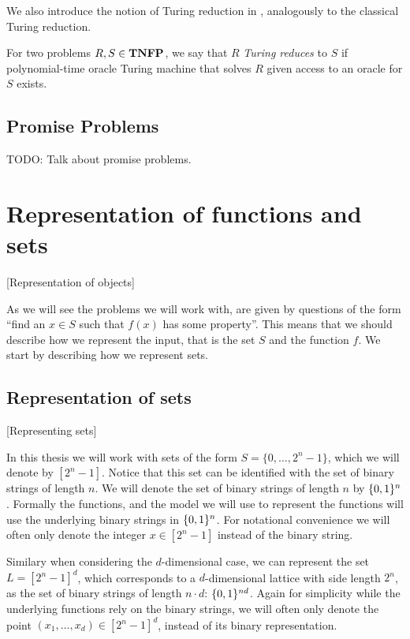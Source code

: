 We also introduce the notion of Turing reduction in \TFNP, analogously to the classical Turing reduction.

\begin{definition}
    For two problems $R, S \in \textbf{TNFP}$, we say that $R$ \emph{Turing reduces} to $S$ if polynomial-time oracle Turing machine that solves $R$ given access to an oracle for $S$ exists.
\end{definition}

\subsection{Promise Problems}

TODO: Talk about promise problems.

\section{Representation of functions and sets}[Representation of objects]

As we will see the problems we will work with, are given by questions of the form ``find an $x \in S$ such that $f(x)$ has some property''. This means that we should describe how we represent the input, that is the set $S$ and the function $f$. We start by describing how we represent sets.

\subsection{Representation of sets}[Representing sets]

In this thesis we will work with sets of the form $S = \{0, \dots, 2^n - 1\}$, which we will denote by $[2^n - 1]$. Notice that this set can be identified with the set of binary strings of length $n$. We will denote the set of binary strings of length $n$ by $\{0, 1\}^n$. Formally the functions, and the model we will use to represent the functions will use the underlying binary strings in $\{0, 1\}^n$. For notational convenience we will often only denote the integer $x \in [2^n - 1]$ instead of the binary string.

Similary when considering the $d$-dimensional case, we can represent the set $L = [2^n - 1]^d$, which corresponds to a $d$-dimensional lattice with side length $2^n$, as the set of binary strings of length $n \cdot d$: $\{0, 1\}^{nd}$. Again for simplicity while the underlying functions rely on the binary strings, we will often only denote the point $(x_1, \dots, x_d) \in [2^n - 1]^d$, instead of its binary representation.

